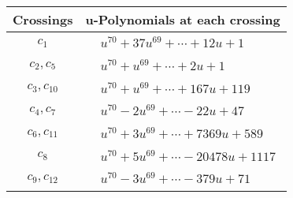 \documentclass[1p]{elsarticle_modified}
\theoremstyle{definition}
\begin{document}
\begin{tabular}{m{50pt}|m{274pt}}
Crossings & \hspace{64pt}u-Polynomials at each crossing \\
\hline $$\begin{aligned}c_{1}\end{aligned}$$&$\begin{aligned}
&u^{70}+37 u^{69}+\cdots+12 u+1
\end{aligned}$\\
\hline $$\begin{aligned}c_{2},c_{5}\end{aligned}$$&$\begin{aligned}
&u^{70}+u^{69}+\cdots+2 u+1
\end{aligned}$\\
\hline $$\begin{aligned}c_{3},c_{10}\end{aligned}$$&$\begin{aligned}
&u^{70}+u^{69}+\cdots+167 u+119
\end{aligned}$\\
\hline $$\begin{aligned}c_{4},c_{7}\end{aligned}$$&$\begin{aligned}
&u^{70}-2 u^{69}+\cdots-22 u+47
\end{aligned}$\\
\hline $$\begin{aligned}c_{6},c_{11}\end{aligned}$$&$\begin{aligned}
&u^{70}+3 u^{69}+\cdots+7369 u+589
\end{aligned}$\\
\hline $$\begin{aligned}c_{8}\end{aligned}$$&$\begin{aligned}
&u^{70}+5 u^{69}+\cdots-20478 u+1117
\end{aligned}$\\
\hline $$\begin{aligned}c_{9},c_{12}\end{aligned}$$&$\begin{aligned}
&u^{70}-3 u^{69}+\cdots-379 u+71
\end{aligned}$\\
\hline
\end{tabular}\\~\\
\newpage\renewcommand{\arraystretch}{1}
\end{document}
